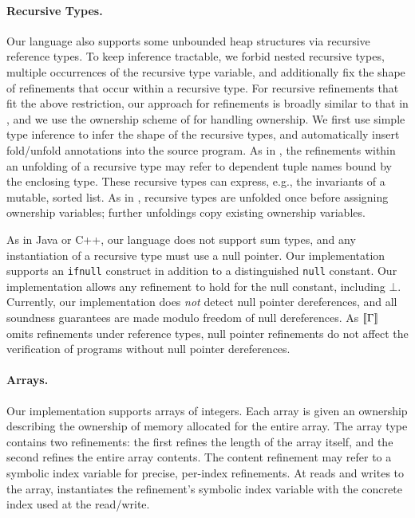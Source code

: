 \paragraph{Recursive Types.}
Our language also supports some unbounded heap structures via recursive
reference types. To keep inference tractable, we forbid nested
recursive types, multiple occurrences of the recursive type variable,
and additionally fix the shape of refinements that occur within a
recursive type. For recursive refinements that fit the
above restriction, our approach for refinements
is broadly similar to that in \cite{kawaguchi2009type}, and we use
the ownership scheme of \cite{suenaga2009fractional} for handling
ownership. We first use simple type inference
to infer the shape of the recursive types, and automatically insert
fold/unfold annotations into the source program. As in
\cite{kawaguchi2009type},
the refinements within an unfolding of a recursive type may refer to
dependent tuple names bound by the enclosing type. These recursive
types can express, e.g., the invariants of a mutable,
sorted list. As in \cite{suenaga2009fractional},
recursive types are unfolded once before assigning ownership variables;
further unfoldings copy existing ownership variables.

As in Java or C++, our language does not support sum types,
and any instantiation of a recursive type must use a null pointer.
Our implementation supports an \lstinline{ifnull} construct
in addition to a distinguished \lstinline{null} constant. Our implementation allows any refinement
to hold for the null constant, including $\bot$. Currently, our implementation
does \emph{not} detect null pointer dereferences, and all soundness
guarantees are made modulo freedom of null dereferences. As $ \left\llbracket{ \Gamma }\right\rrbracket $
omits refinements under reference types, null pointer refinements do not affect
the verification of programs without null pointer dereferences.

\paragraph{Arrays.}
Our implementation supports arrays of integers. Each array is given
an ownership describing the ownership of memory allocated for the entire array.
The array type contains two refinements: the first refines the length of the array itself,
and the second refines the entire array contents.
The content refinement may refer to a symbolic index variable
for precise, per-index refinements. At reads and writes to the
array, \name instantiates the refinement's symbolic index variable with
the concrete index used at the read/write.

